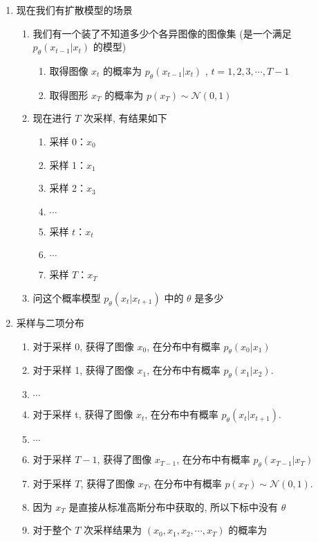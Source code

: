 \begin{enumerate}
    \item 现在我们有扩散模型的场景
    \begin{enumerate}
        \item 我们有一个装了不知道多少个各异图像的图像集 (是一个满足 $p_\theta(x_{t-1}|x_t)$ 的模型)
        \begin{enumerate}
            \item 取得图像 $x_t$ 的概率为 $p_\theta(x_{t-1}|x_t)$ , $t=1,2,3,\cdots,T-1$
            \item 取得图形 $x_T$ 的概率为 $p(x_T)\sim\mathcal{N}(0,1)$
        \end{enumerate}
        \item 现在进行 $T$ 次采样, 有结果如下
        \begin{enumerate}
            \item 采样 0：$x_0$ 
            \item 采样 1：$x_1$ 
            \item 采样 2：$x_3$ 
            \item $\cdots$ 
            \item 采样 $t$：$x_t$ 
            \item $\cdots$
            \item 采样 $T$：$x_T$ 
        \end{enumerate}
        \item 问这个概率模型 $p_\theta(x_{t}|x_{t+1})$ 中的 $\theta$ 是多少
    \end{enumerate}
    \item 采样与二项分布
    \begin{enumerate}
        \item 对于采样 0, 获得了图像 $x_0$, 在分布中有概率 $p_\theta(x_0|x_1)$
        \item 对于采样 1, 获得了图像 $x_1$, 在分布中有概率 $p_\theta(x_1|x_2)$.
        \item $\cdots$
        \item 对于采样 t, 获得了图像 $x_{t}$, 在分布中有概率 $p_\theta(x_{t}|x_{t+1})$.
        \item $\cdots$
        \item 对于采样 $T-1$, 获得了图像 $x_{T-1}$, 在分布中有概率 $p_\theta(x_{T-1}|x_T)$ 
        \item 对于采样 $T$, 获得了图像 $x_{T}$, 在分布中有概率 $p(x_T)\sim\mathcal N (0,1)$. 
        \item 因为 $x_T$ 是直接从标准高斯分布中获取的, 所以下标中没有 $\theta$ 
        \item 对于整个 $T$ 次采样结果为 $(x_0,x_1,x_2,\cdots,x_T)$ 的概率为
        

\end{enumerate}
\end{enumerate}
